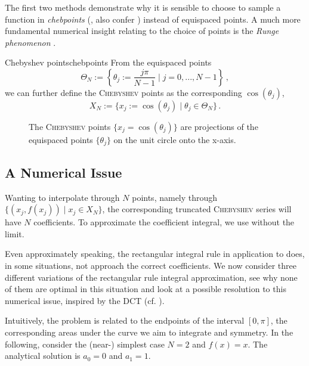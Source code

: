 \documentclass[12pt, a4paper]{article}
\newcommand{\chebyshev}{\textsc{Chebyshev}\xspace}
\begin{document}
  The first two methods demonstrate why it is sensible to choose to sample a function in \textit{chebpoints} (, also confer ) instead of equispaced points.
  A much more fundamental numerical insight relating to the choice of points is the \emph{Runge phenomenon} \parencite{runge-phenomenon}.

  \begin{definition}{Chebyshev points}{chebpoints}
    From the equispaced points
    $$\Theta_N := \left\{\theta_j := \frac{j\pi}{N-1} \;\bigg|\; j = 0, ..., N-1\right\} \,,$$
    we can further define the \chebyshev points as the corresponding $\cos(\theta_j)$,
    $$X_N := \{x_j := \cos(\theta_j) \;|\; \theta_j \in \Theta_N\} \,.$$
  \end{definition}

  \begin{figure}[H]
    \centering
    \caption{The \chebyshev points $\{x_j = \cos(\theta_j)\}$ are projections of the equispaced points $\{\theta_j\}$ on the unit circle onto the x-axis.}
    \label{fig:chebpoints}
  \end{figure}

  \subsection{A Numerical Issue}
  Wanting to interpolate through $N$ points, namely through $\{(x_j, f(x_j)) \;|\; x_j \in X_N\}$, the corresponding truncated \chebyshev series will have $N$ coefficients. To approximate the coefficient integral, we use  without the limit.

  Even approximately speaking, the rectangular integral rule in application to  does, in some situations, not approach the correct coefficients.
  We now consider three different variations of the rectangular rule integral approximation, see why none of them are optimal in this situation and look at a possible resolution to this numerical issue, inspired by the DCT (cf. ).

  Intuitively, the problem is related to the endpoints of the interval $[0, \pi]$, the corresponding areas under the curve we aim to integrate and symmetry.
  In the following, consider the (near-) simplest case $N = 2$ and $f(x) = x$.
  The analytical solution is $a_0 = 0$ and $a_1 = 1$.
\end{document}
